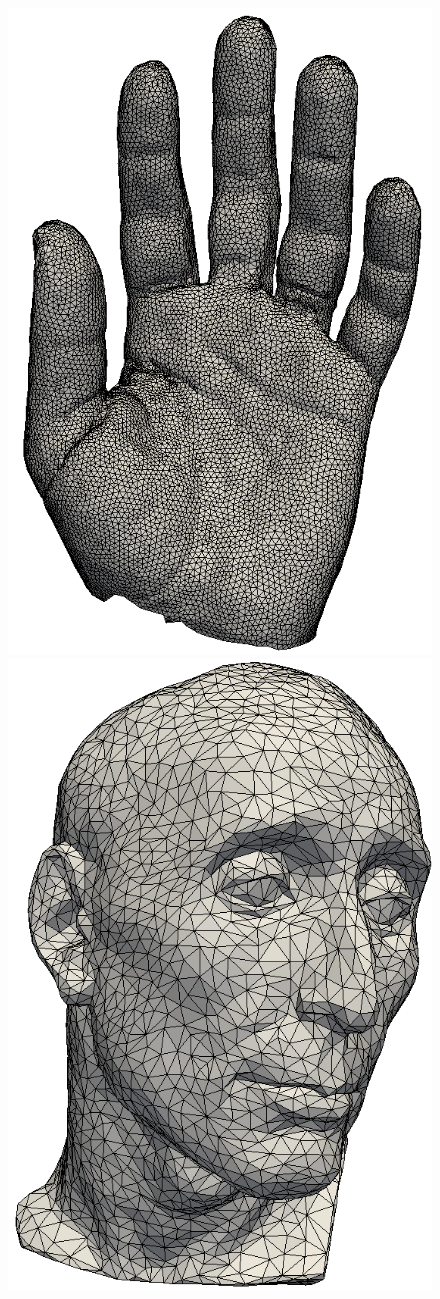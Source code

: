 \documentclass[letter,11pt]{article}
\begin{document}
\begin{figure}
\begin{minipage}{0.30\textwidth}
  \end{minipage}
  \begin{minipage}{.30\textwidth}
    \centering
    \includegraphics[width=0.7\linewidth]{../image/hand_c.png}
  \end{minipage}
  \begin{minipage}{.30\textwidth}
    \centering
    \includegraphics[width=0.7\linewidth]{../image/nicolo_0.png}

\end{minipage}
\end{figure}
\end{document}
